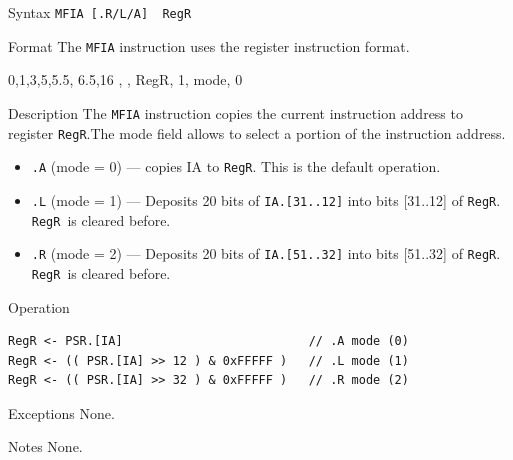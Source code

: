 %
%
\pagebreak
{}

\begin{iPageDescEntry}{Syntax}
\texttt{MFIA [.R/L/A]  RegR}
\end{iPageDescEntry}

\begin{iPageDescEntry}{Format}
The \texttt{MFIA} instruction uses the register instruction format. \\

\begin{flushleft}
\drawInstrFormat
    {0,1,3,5,5.5, 6.5,16}
    {\OpCodeGrpSYS, \OpCodeMFIA, RegR, 1, mode, 0}
\end{flushleft}
\end{iPageDescEntry}

\begin{iPageDescEntry}{Description}
The \texttt{MFIA} instruction copies the current instruction address to register \texttt{RegR}.The mode field allows to select a portion of the instruction address. 

\begin{itemize}
 	\setlength{\itemsep}{0.5em}
    \setlength{\parskip}{0pt}
	\item \texttt{.A} (mode = 0) — copies IA to \texttt{RegR}. This is the default operation.
    \item \texttt{.L} (mode = 1) — Deposits 20 bits of \texttt{IA.[31..12]} into bits [31..12] of \texttt{RegR}. \texttt{RegR} is cleared before.
    \item \texttt{.R} (mode = 2) — Deposits 20 bits of \texttt{IA.[51..32]} into bits [51..32] of \texttt{RegR}. \texttt{RegR} is cleared before. 
\end{itemize}
\end{iPageDescEntry}

\begin{iPageDescOpEntry}{Operation}
\begin{lstlisting}[style=iPageOpStyle]
RegR <- PSR.[IA]                          // .A mode (0)
RegR <- (( PSR.[IA] >> 12 ) & 0xFFFFF )   // .L mode (1)
RegR <- (( PSR.[IA] >> 32 ) & 0xFFFFF )   // .R mode (2)
\end{lstlisting}
\end{iPageDescOpEntry}

\begin{iPageDescEntry}{Exceptions}
None.
\end{iPageDescEntry}

\begin{iPageDescEntry}{Notes}
None.
\end{iPageDescEntry}
